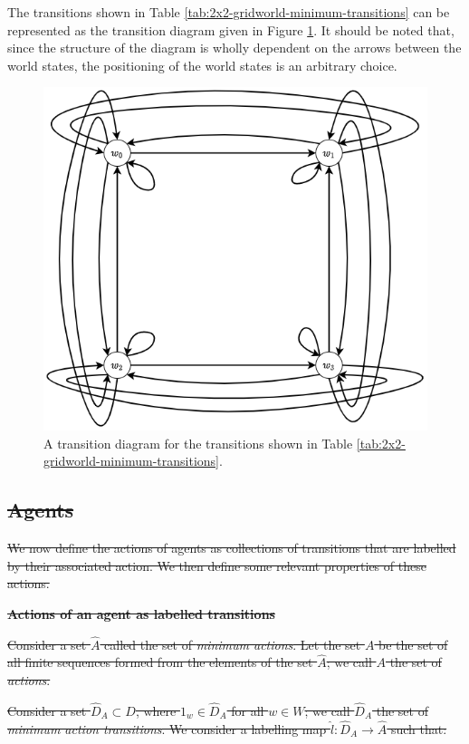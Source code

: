 The transitions shown in Table \ref{tab:2x2-gridworld-minimum-transitions} can be represented as the transition diagram given in Figure \ref{fig:2x2-cyclical-min-trans}.
It should be noted that, since the structure of the diagram is wholly dependent on the arrows between the world states, the positioning of the world states is an arbitrary choice.

\begin{figure}
    \centering
    \includegraphics[width=0.5\linewidth]{2MathematicalFramework/InitialFramework/Images/2x2-cyclical-min-trans.drawio.png}
    \caption{A transition diagram for the transitions shown in Table \ref{tab:2x2-gridworld-minimum-transitions}.}
    \label{fig:2x2-cyclical-min-trans}
\end{figure}

\subsection{\sout{Agents}}
\sout{We now define the actions of agents as collections of transitions that are labelled by their associated action.
We then define some relevant properties of these actions.}

\textbf{\sout{Actions of an agent as labelled transitions}}\label{sec:Agent actions as labelled transitions}

\sout{Consider a set $\hat{A}$ called the set of \textit{minimum actions}.
Let the set $A$ be the set of all finite  sequences formed from the elements of the set $\hat{A}$; we call $A$ the set of \textit{actions}.}

\sout{Consider a set $\hat{D}_{A} \subset D$, where $1_{w} \in \hat{D}_{A}$ for all $w \in W$; we call $\hat{D}_{A}$ the set of \textit{minimum action transitions}.
We consider a labelling map $\hat{l}: \hat{D}_{A} \to \hat{A}$ such that:}

